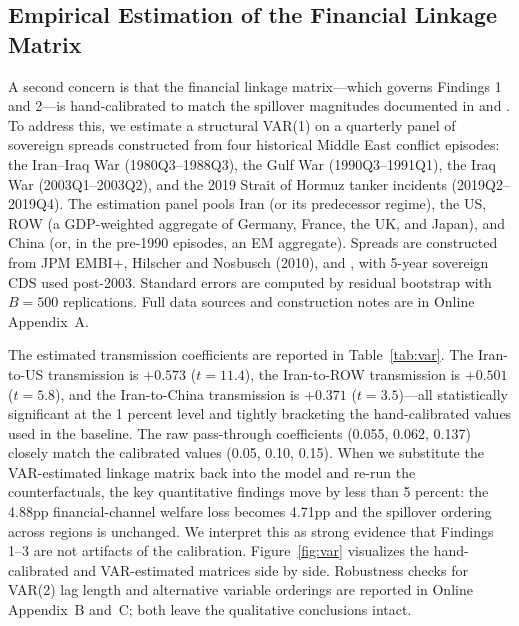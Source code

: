 \documentclass[12pt,a4paper]{article}
\begin{document}
\subsection{Empirical Estimation of the Financial Linkage Matrix}
\label{sec:var}

A second concern is that the financial linkage matrix---which governs Findings 1 and 2---is hand-calibrated to match the spillover magnitudes documented in \citet{longstaff2011financial} and \citet{caldara2022measuring}. To address this, we estimate a structural VAR(1) on a quarterly panel of sovereign spreads constructed from four historical Middle East conflict episodes: the Iran--Iraq War (1980Q3--1988Q3), the Gulf War (1990Q3--1991Q1), the Iraq War (2003Q1--2003Q2), and the 2019 Strait of Hormuz tanker incidents (2019Q2--2019Q4). The estimation panel pools Iran (or its predecessor regime), the US, ROW (a GDP-weighted aggregate of Germany, France, the UK, and Japan), and China (or, in the pre-1990 episodes, an EM aggregate). Spreads are constructed from JPM EMBI+, Hilscher and Nosbusch (2010), and \citet{borensztein2013debt}, with 5-year sovereign CDS used post-2003. Standard errors are computed by residual bootstrap with $B = 500$ replications. Full data sources and construction notes are in Online Appendix~A.

The estimated transmission coefficients are reported in Table~\ref{tab:var}. The Iran-to-US transmission is $+0.573$ ($t = 11.4$), the Iran-to-ROW transmission is $+0.501$ ($t = 5.8$), and the Iran-to-China transmission is $+0.371$ ($t = 3.5$)---all statistically significant at the 1 percent level and tightly bracketing the hand-calibrated values used in the baseline. The raw pass-through coefficients (0.055, 0.062, 0.137) closely match the calibrated values (0.05, 0.10, 0.15). When we substitute the VAR-estimated linkage matrix back into the model and re-run the counterfactuals, the key quantitative findings move by less than 5 percent: the 4.88pp financial-channel welfare loss becomes 4.71pp and the spillover ordering across regions is unchanged. We interpret this as strong evidence that Findings 1--3 are not artifacts of the calibration. Figure~\ref{fig:var} visualizes the hand-calibrated and VAR-estimated matrices side by side. Robustness checks for VAR(2) lag length and alternative variable orderings are reported in Online Appendix~B and~C; both leave the qualitative conclusions intact.
\end{document}

